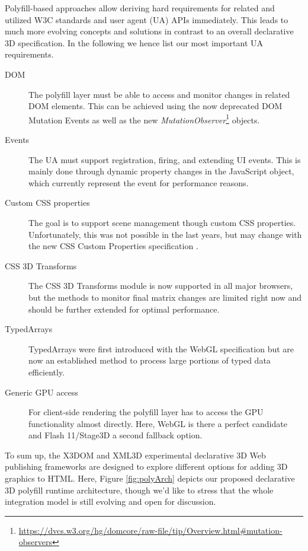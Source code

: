 \documentclass{acmsiggraph}
\begin{document}
Polyfill-based approaches allow deriving hard requirements for related and utilized W3C standards and user agent (UA) APIs immediately. This leads to much more evolving concepts and solutions in contrast to an overall declarative 3D specification. In the following we hence list our most important UA requirements.

\begin{description}
\item[DOM] The polyfill layer must be able to access and monitor changes in related DOM elements. This can be achieved using the now deprecated DOM Mutation Events as well as the new \emph{MutationObserver}\footnote{\url{https://dvcs.w3.org/hg/domcore/raw-file/tip/Overview.html\#mutation-observers}} objects.
\item[Events] The UA must support registration, firing, and extending UI events. This is mainly done through dynamic property changes in the JavaScript object, which currently represent the event for performance reasons.
\item[Custom CSS properties] The goal is to support scene management though custom CSS properties. Unfortunately, this was not possible in the last years, but may change with the new CSS Custom Properties specification \cite{CSSCustom}.
\item[CSS 3D Transforms] The CSS 3D Transforms module \cite{webkit3DCSS} is now supported in all major browsers, but the methods to monitor final matrix changes are limited right now and should be further extended for optimal performance.
\item[TypedArrays] TypedArrays \cite{TypArr12} were first introduced with the WebGL specification but are now an established method to process large portions of typed data efficiently.
\item[Generic GPU access] For client-side rendering the polyfill layer has to access the GPU functionality almost directly. Here, WebGL is there a perfect candidate and Flash 11/Stage3D a second fallback option.
\end{description}

To sum up, the X3DOM and XML3D experimental declarative 3D Web publishing frameworks are designed to explore different options for adding 3D graphics to HTML. Here, Figure \ref{fig:polyArch} depicts our proposed declarative 3D polyfill runtime architecture, though we'd like to stress that the whole integration model is still evolving and open for discussion.
\end{document}
